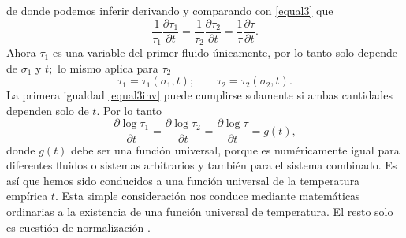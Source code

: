 \documentclass{article}
\theoremstyle{definition} \newtheorem{defi}{Definici\'on}
\theoremstyle{definition} \newtheorem{teo}{Teorema}
\theoremstyle{definition} \newtheorem{cor}{Corolario}
\begin{document}
de donde podemos inferir derivando y comparando con \eqref{equal3} que
\begin{equation}\label{equal3inv}
\frac{1}{\tau_1}\frac{\partial \tau_1}{\partial t}=\frac{1}{\tau_2}\frac{\partial \tau_2}{\partial t}=\frac{1}{\tau}\frac{\partial \tau}{\partial t}.
\end{equation}
Ahora $\tau_1$ es una variable del primer fluido \'unicamente, por lo tanto solo depende de $\sigma_1$ y $t;$ lo mismo aplica para $\tau_2$
\begin{equation}
\tau_1=\tau_1(\sigma_1,t); \qquad \tau_2=\tau_2(\sigma_2,t).
\end{equation}
La primera igualdad \eqref{equal3inv} puede cumplirse solamente si ambas cantidades dependen solo de $t.$ Por lo tanto
\begin{equation}\label{logs}
\frac{\partial \log \tau_1}{\partial t}=\frac{\partial \log \tau_2}{\partial t}=\frac{\partial \log \tau}{\partial t}=g(t),
\end{equation}
donde $g(t)$ debe ser una funci\'on universal, porque es num\'ericamente igual para diferentes fluidos o sistemas arbitrarios y tambi\'en para el sistema combinado. Es as\'i que hemos sido conducidos a una funci\'on universal de la temperatura emp\'irica $t.$ Esta simple consideraci\'on nos conduce mediante matem\'aticas ordinarias a la existencia de una funci\'on universal de temperatura. El resto solo es cuesti\'on de normalizaci\'on \cite{MB}.
\end{document}
